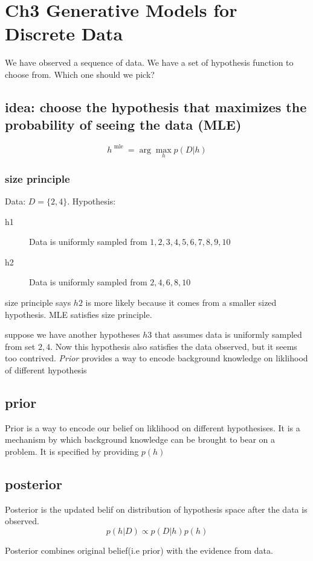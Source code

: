 \documentclass[11pt]{article}
\begin{document}
\section{Ch3 Generative Models for Discrete Data}
We have observed a sequence of data. We have a set of hypothesis function to choose from. Which one should we pick?

\subsection{idea: choose the hypothesis that maximizes the probability of seeing the data (MLE)}
\[
h^{\mbox{ mle }} = \arg\max_h p(D|h)
\]

\subsubsection{size principle}
Data: $D=\{2,4\}$. Hypothesis:
\begin{description}
\item[h1] Data is uniformly sampled from ${1,2,3,4,5,6,7,8,9,10}$
\item[h2] Data is uniformly sampled from ${2,4,6,8,10}$
\end{description}

size principle says $h2$ is more likely because it comes from a smaller sized hypothesis. MLE satisfies size principle.

suppose we have another hypotheses $h3$ that assumes data is uniformly sampled from set ${2,4}$. Now this hypothesis also satisfies the data observed, but it seems too contrived. \emph{Prior} provides a way to encode background knowledge on liklihood of different hypothesis

\subsection{prior}
Prior is a way to encode our belief on liklihood on different hypothesises. It is a mechanism by which background knowledge can be brought to bear on a problem. It is specified by providing $p(h)$

\subsection{posterior}
Posterior is the updated belif on distribution of hypothesis space after the data is observed.
\[
p(h|D) \propto p(D|h)p(h)
\]

Posterior combines original belief(i.e prior) with the evidence from data.
\end{document}
